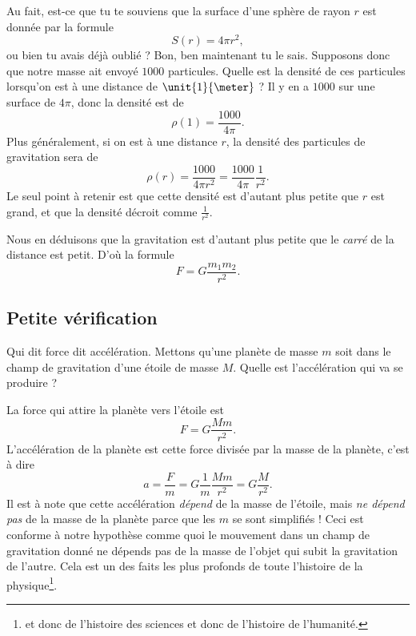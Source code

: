 \documentclass[a4paper,12pt]{book}
\theoremstyle{mes_exemples}	\newtheorem{exemple}[numtho]{Exemple}
\theoremstyle{mes_tho}
\begin{document}
Au fait, est-ce que tu te souviens que la surface d'une sphère de rayon $r$ est donnée par la formule
\begin{equation}
	S(r)=4\pi r^2,
\end{equation}
ou bien tu avais déjà oublié ? Bon, ben maintenant tu le sais. Supposons donc que notre masse ait envoyé $1000$ particules. Quelle est la densité de ces particules lorsqu'on est à une distance de $\unit{1}{\meter}$ ? Il y en a $1000$ sur une surface de $4\pi$, donc la densité est de
\begin{equation}
	\rho(1)=\frac{ 1000 }{ 4\pi }.
\end{equation}
Plus généralement, si on est à une distance $r$, la densité des particules de gravitation sera de 
\begin{equation}
	\rho(r)=\frac{ 1000 }{ 4\pi r^2 }=\frac{ 1000 }{ 4\pi }\frac{1}{ r^2 }.
\end{equation}
Le seul point à retenir est que cette densité est d'autant plus petite que $r$ est grand, et que la densité décroit comme $\frac{1}{ r^2 }$.

Nous en déduisons que la gravitation est d'autant plus petite que le \emph{carré} de la distance est petit. D'où la formule
\begin{equation}			\label{EqFormGravScal}
	F=G\frac{ m_1m_2 }{ r^2 }.
\end{equation}

\subsection{Petite vérification}

Qui dit force dit accélération. Mettons qu'une planète de masse $m$ soit dans le champ de gravitation d'une étoile de masse $M$. Quelle est l'accélération qui va se produire ?

La force qui attire la planète vers l'étoile est 
\begin{equation}
	F=G\frac{ Mm }{ r^2 }.
\end{equation}
L'accélération de la planète est cette force divisée par la masse de la planète, c'est à dire
\begin{equation}
	a=\frac{ F }{ m }=G\frac{1}{ m }\frac{ Mm }{ r^2 }=G\frac{ M }{ r^2 }.
\end{equation}
Il est à note que cette accélération \emph{dépend} de la masse de l'étoile, mais \emph{ne dépend pas} de la masse de la planète parce que les $m$ se sont simplifiés ! Ceci est conforme à notre hypothèse comme quoi le mouvement dans un champ de gravitation donné ne dépends pas de la masse de l'objet qui subit la gravitation de l'autre. Cela est un des faits les plus profonds de toute l'histoire de la physique\footnote{et donc de l'histoire des sciences et donc de l'histoire de l'humanité.}.
\end{document}
